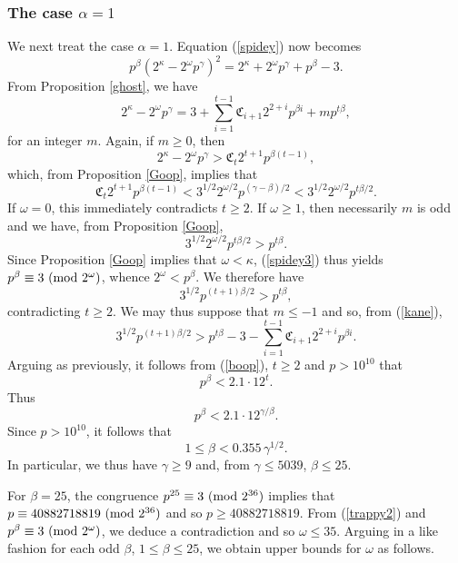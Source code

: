 \documentclass{amsart}
\def\mod#1{{\ifmmode\text{\rm\ (mod~$#1$)}
\else\discretionary{}{}{\hbox{ }}\rm(mod~$#1$)\fi}}
\begin{document}
{\subsubsection{The case $\alpha =1$} We next treat the case $\alpha=1$. Equation (\ref{spidey})  now becomes
\begin{equation} \label{spidey3}
 p^\beta (2^\kappa-2^\omega p^\gamma)^2 = 2^\kappa+2^\omega p^\gamma + p^\beta-3.
 \end{equation}
From Proposition \ref{ghost}, we have
$$
2^\kappa - 2^\omega p^\gamma = 3 + \sum_{i=1}^{t-1} \mathfrak{C}_{i+1} 2^{2+ i} p^{\beta i} +m p^{t \beta},
$$
for an integer $m$. Again, if $m \geq 0$, then 
$$
2^\kappa - 2^\omega p^\gamma > \mathfrak{C}_{t} 2^{t+1} p^{\beta (t-1)},
$$
which, from  Proposition \ref{Goop}, implies that 
$$
\mathfrak{C}_{t} 2^{t+1} p^{\beta (t-1)} <
3^{1/2} 2^{\omega/2} p^{(\gamma-\beta)/2}
< 3^{1/2} 2^{\omega/2} p^{t \beta/2}. 
$$
If $\omega=0$, this immediately contradicts $t \geq 2$. If $\omega \geq 1$, then necessarily $m$ is odd and we have, 
from Proposition \ref{Goop}, 
$$
3^{1/2} 2^{\omega/2} p^{t \beta/2} > p^{t\beta}.
$$
Since Proposition \ref{Goop} implies that 
$\omega < \kappa$,  (\ref{spidey3}) thus yields $p^\beta \equiv 3 \mod{2^\omega}$, whence $2^\omega < p^\beta$. We therefore have 
$$
3^{1/2}  p^{(t+1)\beta/2} > p^{t\beta},
$$
contradicting $t \geq 2$. We may thus suppose that 
 $m \leq -1$ and so, from (\ref{kane}), 
\begin{equation} \label{fossil2}
3^{1/2} p^{(t+1) \beta/2} > p^{t\beta} -3-
\sum_{i=1}^{t-1} \mathfrak{C}_{i+1} 2^{2+ i} p^{\beta i}.
\end{equation} 
Arguing as previously, it follows from (\ref{boop}), $t \geq 2$ and $p>10^{10}$ that
$$
p^\beta < 2.1 \cdot 12^{t}.
$$
Thus
\begin{equation} \label{trappy2}
p^\beta < 2.1 \cdot 12^{\gamma/\beta}.
\end{equation}
Since $p > 10^{10}$, it follows that 
\begin{equation} \label{b-bound2}
1 \leq \beta < 0.355 \, \gamma^{1/2}.
\end{equation}
In particular, we thus have $\gamma \geq 9$ and, from $\gamma \leq 5039$, $\beta \leq 25$.

For $\beta=25$, the congruence $p^{25} \equiv 3 \mod{2^{36}}$ implies that $p \equiv 40882718819 \mod{2^{36}}$ and so
$p \geq 40882718819$. From (\ref{trappy2}) and $p^\beta \equiv 3 \mod{2^\omega}$, we deduce a contradiction and so $\omega \leq 35$. Arguing in a like fashion for each odd $\beta$, $1 \leq \beta \leq 25$, we obtain  upper bounds for $\omega$ as follows.

}
\end{document}
